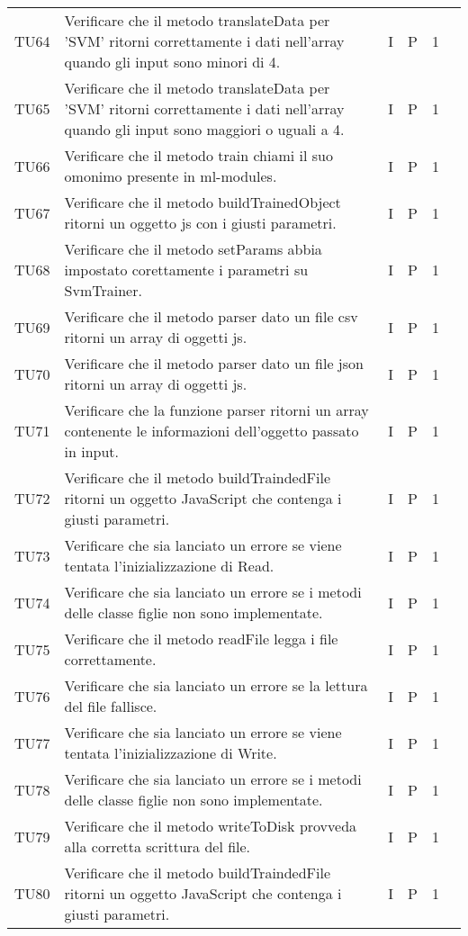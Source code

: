 \begin{longtable} {
		>{}p{12mm}
		>{}p{79.5mm}
		>{}p{9mm}
		>{}p{8mm}
		>{}p{14mm}
		>{}p{0mm}}
	TU64		& Verificare che il metodo translateData per 'SVM\glo' ritorni correttamente i dati nell'array quando gli input sono minori di 4.& I & P & 1 &\TBstrut \\ [2mm]
	TU65		& Verificare che il metodo translateData per 'SVM\glo' ritorni correttamente i dati nell'array quando gli input sono maggiori o uguali a 4.& I & P & 1 &\TBstrut \\ [2mm]
	TU66		& Verificare che il metodo train chiami il suo omonimo presente in ml-modules.& I & P & 1 &\TBstrut \\ [2mm]
	TU67		& Verificare che il metodo buildTrainedObject ritorni un oggetto js con i giusti parametri.& I & P & 1 &\TBstrut \\ [2mm]
	TU68		& Verificare che il metodo setParams abbia impostato corettamente i parametri su SvmTrainer.& I & P & 1 &\TBstrut \\ [2mm]
	TU69		& Verificare che il metodo parser dato un file csv ritorni un array di oggetti js.& I & P & 1 &\TBstrut \\ [2mm]
	TU70		& Verificare che il metodo parser dato un file json ritorni un array di oggetti js.& I & P & 1 &\TBstrut \\ [2mm]
	TU71		& Verificare che la funzione parser ritorni un array contenente le informazioni dell'oggetto passato in input.& I & P & 1 &\TBstrut \\ [2mm]
	TU72		& Verificare che il metodo buildTraindedFile ritorni un oggetto JavaScript che contenga i giusti parametri.& I & P & 1 &\TBstrut \\ [2mm]
	TU73		& Verificare che sia lanciato un errore se viene tentata l'inizializzazione di Read.& I & P & 1 &\TBstrut \\ [2mm]
	TU74		& Verificare che sia lanciato un errore se i metodi delle classe figlie non sono implementate.& I & P & 1 &\TBstrut \\ [2mm]
	TU75		& Verificare che il metodo readFile legga i file correttamente.& I & P & 1 &\TBstrut \\ [2mm]
	TU76		& Verificare che sia lanciato un errore se la lettura del file fallisce.& I & P & 1 &\TBstrut \\ [2mm]
	TU77		& Verificare che sia lanciato un errore se viene tentata l'inizializzazione di Write.& I & P & 1 &\TBstrut \\ [2mm]
	TU78		& Verificare che sia lanciato un errore se i metodi delle classe figlie non sono implementate.& I & P & 1 &\TBstrut \\ [2mm]
	TU79		& Verificare che il metodo writeToDisk provveda alla corretta scrittura del file.& I & P & 1 &\TBstrut \\ [2mm]
    TU80		& Verificare che il metodo buildTraindedFile ritorni un oggetto JavaScript che contenga i giusti parametri. & I & P & 1 &\TBstrut \\ [2mm]


\end{longtable}
